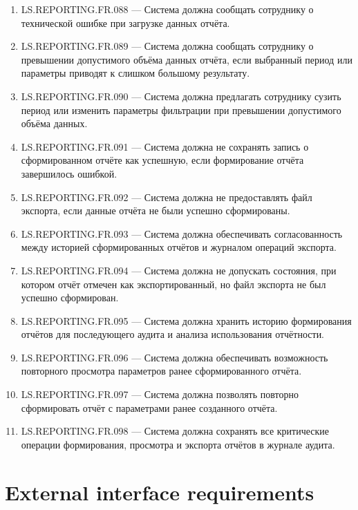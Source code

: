 \documentclass[12pt,a4paper]{article}
\begin{document}
\begin{enumerate}
		\item LS.REPORTING.FR.088 --- Система должна сообщать сотруднику о технической
		ошибке при загрузке данных отчёта.
		
		\item LS.REPORTING.FR.089 --- Система должна сообщать сотруднику о превышении
		допустимого объёма данных отчёта, если выбранный период или параметры приводят
		к слишком большому результату.
		
		\item LS.REPORTING.FR.090 --- Система должна предлагать сотруднику сузить период
		или изменить параметры фильтрации при превышении допустимого объёма данных.
		
		\item LS.REPORTING.FR.091 --- Система должна не сохранять запись о сформированном
		отчёте как успешную, если формирование отчёта завершилось ошибкой.
		
		\item LS.REPORTING.FR.092 --- Система должна не предоставлять файл экспорта, если
		данные отчёта не были успешно сформированы.
		
		\item LS.REPORTING.FR.093 --- Система должна обеспечивать согласованность между
		историей сформированных отчётов и журналом операций экспорта.
		
		\item LS.REPORTING.FR.094 --- Система должна не допускать состояния, при котором
		отчёт отмечен как экспортированный, но файл экспорта не был успешно сформирован.
		
		\item LS.REPORTING.FR.095 --- Система должна хранить историю формирования отчётов
		для последующего аудита и анализа использования отчётности.
		
		\item LS.REPORTING.FR.096 --- Система должна обеспечивать возможность повторного
		просмотра параметров ранее сформированного отчёта.
		
		\item LS.REPORTING.FR.097 --- Система должна позволять повторно сформировать отчёт
		с параметрами ранее созданного отчёта.
		
		\item LS.REPORTING.FR.098 --- Система должна сохранять все критические операции
		формирования, просмотра и экспорта отчётов в журнале аудита.
	\end{enumerate}
	
	\section{External interface requirements}
	
\end{document}

